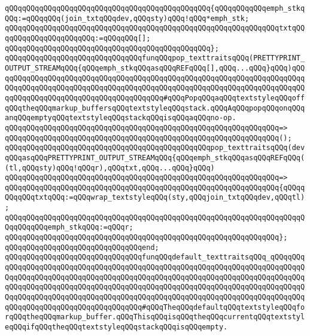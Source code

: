 \verb|qQQqqQQqqQQqqQQqqQQqqQQqqQQqqQQqqQQqqQQqqQQqqQQq{qQQqqQQqqQQqemph_stkqQQq:=qQQqqQQq(join_txtqQQqdev,qQQqsty)qQQq!qQQq*emph_stk;|\newline
\verb|qQQqqQQqqQQqqQQqqQQqqQQqqQQqqQQqqQQqqQQqqQQqqQQqqQQqqQQqqQQqqQQqtxtqQQqqQQqqQQqqQQqqQQqqQQq:=qQQqqQQq[];|\newline
\verb|qQQqqQQqqQQqqQQqqQQqqQQqqQQqqQQqqQQqqQQqqQQqqQQq};|\newline
\newline
\verb|qQQqqQQqqQQqqQQqqQQqqQQqqQQqqQQqfunqQQqpop_texttraitsqQQq(PRETTYPRINT_OUTPUT_STREAMqQQq{qQQqemph_stkqQQqasqQQqREFqQQq[],qQQq...qQQq}qQQq)qQQqqQQqqQQqqQQqqQQqqQQqqQQqqQQqqQQqqQQqqQQqqQQqqQQqqQQqqQQqqQQqqQQqqQQqqQQqqQQqqQQqqQQqqQQqqQQqqQQqqQQqqQQqqQQqqQQqqQQqqQQqqQQqqQQqqQQqqQQqqQQqqQQqqQQqqQQqqQQqqQQqqQQqqQQqqQQqqQQq#qQQqPopqQQqaqQQqtextstyleqQQqoffqQQqtheqQQqmarkup_buffersqQQqtextstyleqQQqstack.qQQqAqQQqpopqQQqonqQQqanqQQqemptyqQQqtextstyleqQQqstackqQQqisqQQqaqQQqno-op.|\newline
\verb|qQQqqQQqqQQqqQQqqQQqqQQqqQQqqQQqqQQqqQQqqQQqqQQqqQQqqQQqqQQqqQQq=>|\newline
\verb|qQQqqQQqqQQqqQQqqQQqqQQqqQQqqQQqqQQqqQQqqQQqqQQqqQQqqQQqqQQqqQQq();|\newline
\newline
\verb|qQQqqQQqqQQqqQQqqQQqqQQqqQQqqQQqqQQqqQQqqQQqqQQqpop_texttraitsqQQq(devqQQqasqQQqPRETTYPRINT_OUTPUT_STREAMqQQq{qQQqemph_stkqQQqasqQQqREFqQQq((tl,qQQqsty)qQQq!qQQqr),qQQqtxt,qQQq...qQQq}qQQq)|\newline
\verb|qQQqqQQqqQQqqQQqqQQqqQQqqQQqqQQqqQQqqQQqqQQqqQQqqQQqqQQqqQQqqQQq=>|\newline
\verb|qQQqqQQqqQQqqQQqqQQqqQQqqQQqqQQqqQQqqQQqqQQqqQQqqQQqqQQqqQQqqQQq{qQQqqQQqqQQqtxtqQQq:=qQQqwrap_textstyleqQQq(sty,qQQqjoin_txtqQQqdev,qQQqtl);|\newline
\verb|qQQqqQQqqQQqqQQqqQQqqQQqqQQqqQQqqQQqqQQqqQQqqQQqqQQqqQQqqQQqqQQqqQQqqQQqqQQqqQQqemph_stkqQQq:=qQQqr;|\newline
\verb|qQQqqQQqqQQqqQQqqQQqqQQqqQQqqQQqqQQqqQQqqQQqqQQqqQQqqQQqqQQqqQQq};|\newline
\verb|qQQqqQQqqQQqqQQqqQQqqQQqqQQqqQQqend;|\newline
\newline
\newline
\verb|qQQqqQQqqQQqqQQqqQQqqQQqqQQqqQQqfunqQQqdefault_texttraitsqQQq_qQQqqQQqqQQqqQQqqQQqqQQqqQQqqQQqqQQqqQQqqQQqqQQqqQQqqQQqqQQqqQQqqQQqqQQqqQQqqQQqqQQqqQQqqQQqqQQqqQQqqQQqqQQqqQQqqQQqqQQqqQQqqQQqqQQqqQQqqQQqqQQqqQQqqQQqqQQqqQQqqQQqqQQqqQQqqQQqqQQqqQQqqQQqqQQqqQQqqQQqqQQqqQQqqQQqqQQqqQQqqQQqqQQqqQQqqQQqqQQqqQQqqQQqqQQqqQQqqQQqqQQqqQQqqQQqqQQqqQQqqQQqqQQqqQQqqQQqqQQqqQQqqQQqqQQqqQQqqQQq#qQQqTheqQQqdefaultqQQqtextstyleqQQqforqQQqtheqQQqmarkup_buffer.qQQqThisqQQqisqQQqtheqQQqcurrentqQQqtextstyleqQQqifqQQqtheqQQqtextstyleqQQqstackqQQqisqQQqempty.|\newline
